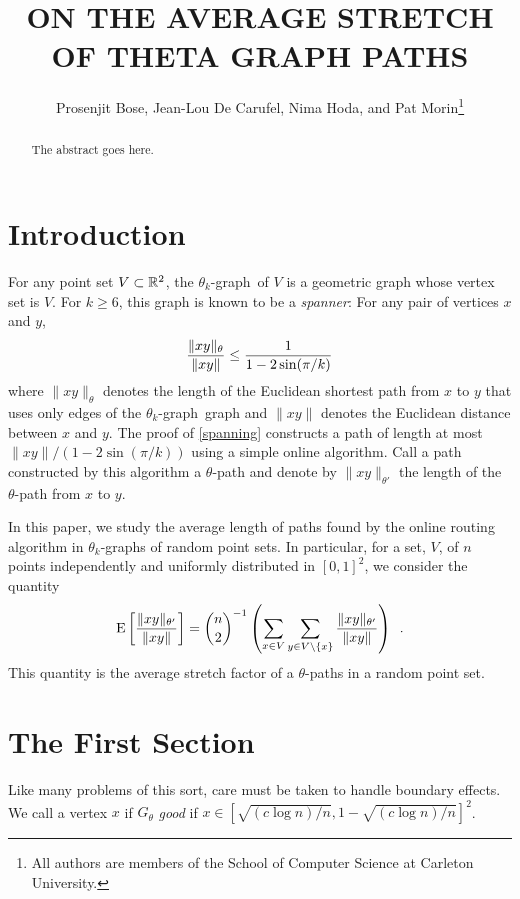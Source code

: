 \documentclass{patmorin}
\title{\MakeUppercase{On the Average Stretch of Theta Graph Paths}}
\author{Prosenjit Bose,
        Jean-Lou De Carufel,
        Nima Hoda, and
        Pat Morin\thanks{All authors are members of the School of Computer Science at Carleton University.}}
\begin{document}
\maketitle

\begin{abstract}
  The abstract goes here.
\end{abstract}

\newcommand{\tkgraph}{$\theta_k$-graph}

\section{Introduction}

For any point set $V\subset\mathbb{R}^2$, the \tkgraph\ of $V$ \cite{keilXX}
is a geometric graph whose vertex set is $V$.  For $k\ge 6$, this graph
is known to be a \emph{spanner}:  For any pair of vertices $x$ and $y$,
\begin{equation}
     \frac{\|xy\|_\theta}{\|xy\|} \le \frac{1}{1-2\sin(\pi/k)} \eqlabel{spanning}
\end{equation}
where $\|xy\|_\theta$ denotes the length of the Euclidean shortest
path from $x$ to $y$ that uses only edges of the \tkgraph\ graph
and $\|xy\|$ denotes the Euclidean distance between $x$ and $y$.
The proof of \eqref{spanning} constructs a path of length at most
$\|xy\|/(1-2\sin(\pi/k))$ using a simple online algorithm.  Call a path constructed by this algorithm a $\theta$-path and denote by
$\|xy\|_{\theta'}$ the length of the $\theta$-path from $x$ to $y$.

In this paper, we study the average length of paths found by the online
routing algorithm in \tkgraph s of random point sets.  In particular, for a set, $V$, of $n$ points independently and uniformly distributed in $[0,1]^2$, we consider the quantity
\[
   \mathrm{E}\left[\frac{\|xy\|_{\theta'}}{\|xy\|}\right]
 =      \binom{n}{2}^{-1}
        \left(
          \sum_{x\in V}
          \sum_{y\in V\setminus\{x\}} \frac{\|xy\|_{\theta'}}{\|xy\|}
        \right) \enspace .
\]
This quantity is the average stretch factor of a $\theta$-paths in a
random point set.

\section{The First Section}

Like many problems of this sort, care must be taken to handle
boundary effects.  We call a vertex $x$ if $G_\theta$ \emph{good} if
$x\in\left[\sqrt{(c\log n)/n},1-\sqrt{(c\log n)/n}\right]^2$.
\end{document}
